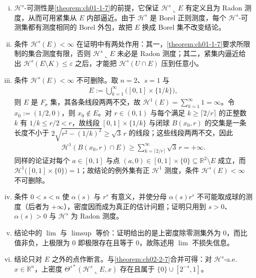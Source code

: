 \documentclass[../../main.tex]{subfiles}%
\begin{document}
\begin{remark}\label{remark:ch02-thm-2-6-条件}
\begin{enumerate}[(i)]
\item $\mathcal{H}^s$-可测性是\cref{theorem:ch01-1-7}的前提，它保证 $\mathcal{H}^s\llcorner E$ 有定义且为 Radon 测度，从而可用紧集从 $E$ 内部逼近。由于 $\mathcal{H}^s$ 是 Borel 正则测度，每个 $\mathcal{H}^s$-可测集都有测度相同的 Borel 外包，故把 $E$ 换成 Borel 集不改变结论。%
\item 条件 $\mathcal{H}^s(E)<\infty$ 在证明中有两处作用：其一，\cref{theorem:ch01-1-7}要求所限制的集合测度有限，否则 $\mathcal{H}^s\llcorner E$ 未必是 Radon 测度；其二，紧集内逼近给出 $\mathcal{H}^s(E\setminus K)\leqslant\varepsilon$ 之后，才能把 $\mathcal{H}^s(U\cap E)$ 压到任意小。%
\item 条件 $\mathcal{H}^s(E)<\infty$ 不可删除。取 $n=2$、$s=1$ 与
\begin{align*}
E:=\bigcup_{k=1}^{\infty}\bigl([0,1]\times\{1/k\}\bigr),
\end{align*}
则 $E$ 是 $F_\sigma$ 集，其各条线段两两不交，故 $\mathcal{H}^1(E)=\sum_{k=1}^{\infty}1=\infty$。令 $x_0:=(1/2,0)$，则 $x_0\notin E$。对 $r\in(0,1)$ 与每个满足 $k\geqslant\lceil2/r\rceil$ 的正整数 $k$ 有 $1/k\leqslant r/2<r$，故线段 $[0,1]\times\{1/k\}$ 与闭球 $B(x_0,r)$ 的交集是一条长度不小于 $2\sqrt{r^2-(1/k)^2}\geqslant\sqrt3\,r$ 的线段；这些线段两两不交，因此
\begin{align*}
\mathcal{H}^1(B(x_0,r)\cap E)\geqslant\sum_{k=\lceil2/r\rceil}^{\infty}\sqrt3\,r=+\infty .
\end{align*}
同样的论证对每个 $a\in[0,1]$ 与点 $(a,0)\in[0,1]\times\{0\}\subseteq\mathbb{R}^2\setminus E$ 成立，而 $\mathcal{H}^1\bigl([0,1]\times\{0\}\bigr)=1$；故结论的例外集有正 $\mathcal{H}^1$ 测度，条件 $\mathcal{H}^s(E)<\infty$ 不可删除。
\item 条件 $0<s<n$ 使 $\alpha(s)$ 与 $r^s$ 有意义，并使分母 $\alpha(s)r^s$ 不可能取成球的测度（后者为 $+\infty$），密度因而成为真正的估计问题；证明只用到 $s>0$、$\alpha(s)>0$ 与 $\mathcal{H}^s$ 为 Radon 测度。
\item 结论中的 $\lim$ 与 $\limsup$ 等价：证明给出的是上密度除零测集外为 $0$，而比值非负，上极限为 $0$ 即极限存在且等于 $0$，故陈述用 $\lim$ 不损失信息。
\item 结论只对 $E$ 之外的点作断言。与\cref{theorem:ch02-2-7}合并可得：对 $\mathcal{H}^s$-a.e. $x\in\mathbb{R}^n$，上密度 $\Theta^{s*}(\mathcal{H}^s\llcorner E,x)$ 存在且属于 $\{0\}\cup[2^{-s},1]$。%
\end{enumerate}
\end{remark}
\end{document}
